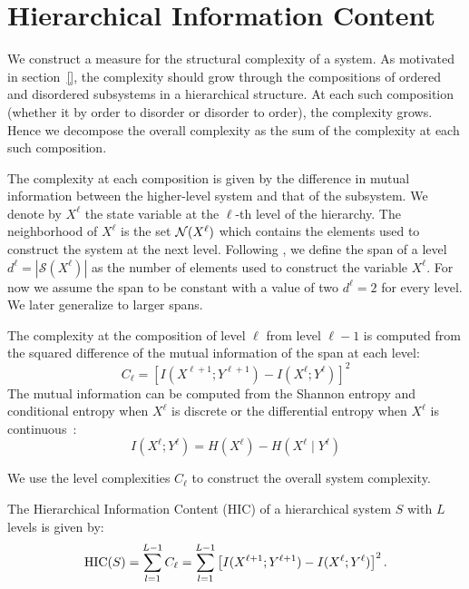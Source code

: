 \section{Hierarchical Information Content}
\label{sec:hic}

We construct a measure for the structural complexity of a system. As motivated
in section~\ref{}, the complexity should grow through the compositions of
ordered and disordered subsystems in a hierarchical structure. At each such
composition (whether it by order to disorder or disorder to order), the
complexity grows. Hence we decompose the overall complexity as the sum of the
complexity at each such composition.

The complexity at each composition is given by the difference in mutual
information between the higher-level system and that of the subsystem. We
denote by $X^{\ell}$ the state variable at the $\ell$-th level of the
hierarchy. The neighborhood of $X^\ell$ is the set $\mathcal{N}(X^\ell)$ which
contains the elements used to construct the system at the next level. Following
\citet{simon1991architecture}, we define the span of a level $d^\ell =
\left|\mathcal{S}(X^\ell)\right|$ as the number of elements used to construct the variable $X^\ell$. For
now we assume the span to be constant with a value of two $d^\ell = 2$ for
every level. We later generalize to larger spans.

The complexity at the composition of level $\ell$ from level $\ell -1$ is
computed from the squared difference of the mutual information of the
span at each level:
\begin{equation}
  C_\ell = \left[ I(X^{\ell+1}; Y^{\ell+1}) - I(X^\ell; Y^\ell) \right]^2
\end{equation}
The mutual information can be computed from the Shannon entropy and conditional
entropy when $X^\ell$ is discrete or the differential entropy when $X^\ell$ is
continuous~\citep{cover1999elements}:
\begin{equation}
\label{eq:mutual_information}
I(X^\ell; Y^\ell) = H(X^\ell) - H(X^\ell \mid Y^\ell)
\end{equation}

We use the level complexities $C_\ell$ to construct the overall system complexity.
\begin{definition}
\label{def:hic}
  The Hierarchical Information Content (HIC) of a hierarchical system $S$ with
  $L$ levels is given by:
  \begin{equation}
    \label{eq:hic}
    \textup{HIC}(S) = \sum_{l=1}^{L-1} C_\ell = \sum_{l=1}^{L-1} \left[ I(X^{\ell+1}; Y^{\ell+1}) - I(X^\ell; Y^\ell) \right]^2.
  \end{equation}
\end{definition}

